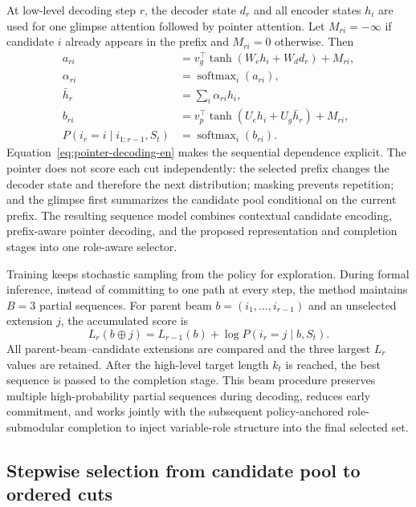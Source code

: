 \documentclass[final,5p,times,twocolumn]{elsarticle}
\begin{document}
At low-level decoding step $r$, the decoder state $d_r$ and all encoder states $h_i$ are used for one glimpse attention followed by pointer attention. Let $M_{ri}=-\infty$ if candidate $i$ already appears in the prefix and $M_{ri}=0$ otherwise. Then
\begin{equation}
\begin{aligned}
a_{ri}&=v_g^\top\tanh(W_e h_i+W_d d_r)+M_{ri},\\
\alpha_{ri}&=\operatorname{softmax}_i(a_{ri}),\\
\bar h_r&=\sum_i\alpha_{ri}h_i,\\
b_{ri}&=v_p^\top\tanh(U_e h_i+U_g\bar h_r)+M_{ri},\\
P(i_r=i\mid i_{1:r-1},S_t)&=\operatorname{softmax}_i(b_{ri}).
\end{aligned}
\label{eq:pointer-decoding-en}
\end{equation}
Equation~\eqref{eq:pointer-decoding-en} makes the sequential dependence explicit. The pointer does not score each cut independently: the selected prefix changes the decoder state and therefore the next distribution; masking prevents repetition; and the glimpse first summarizes the candidate pool conditional on the current prefix. The resulting sequence model combines contextual candidate encoding, prefix-aware pointer decoding, and the proposed representation and completion stages into one role-aware selector.

Training keeps stochastic sampling from the policy for exploration. During formal inference, instead of committing to one path at every step, the method maintains $B=3$ partial sequences. For parent beam $b=(i_1,\ldots,i_{r-1})$ and an unselected extension $j$, the accumulated score is
\begin{equation}
L_r(b\oplus j)=L_{r-1}(b)+\log P(i_r=j\mid b,S_t).
\label{eq:beam-score-en}
\end{equation}
All parent-beam--candidate extensions are compared and the three largest $L_r$ values are retained. After the high-level target length $k_t$ is reached, the best sequence is passed to the completion stage. This beam procedure preserves multiple high-probability partial sequences during decoding, reduces early commitment, and works jointly with the subsequent policy-anchored role-submodular completion to inject variable-role structure into the final selected set.

\subsection{Stepwise selection from candidate pool to ordered cuts}
\end{document}
